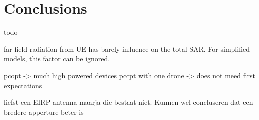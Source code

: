 \chapter{Conclusions}
\label{chap:conclusions}

todo

far field radiation from UE has barely influence on the total SAR. For simplified models, this factor can be ignored.

pcopt -> much high powered devices
pcopt with one drone -> does not meed first expectations

liefst een EIRP antenna maarja die bestaat niet. Kunnen wel concluseren dat een bredere apperture beter is